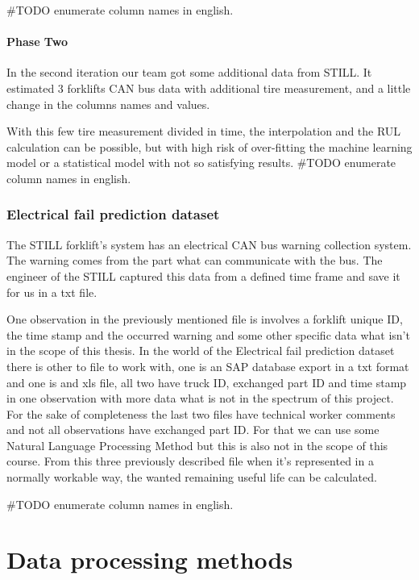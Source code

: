 \#TODO enumerate column names in english.
				\paragraph{Phase Two}
In the second iteration our team got some additional data from STILL. It estimated 3 forklifts CAN bus data with additional tire measurement, and a little change in the columns names and values.

With this few tire measurement divided in time, the interpolation and the RUL calculation can be possible, but with high risk of over-fitting the machine learning model or a statistical model with not so satisfying results.
\#TODO enumerate column names in english.
			\subsubsection{Electrical fail prediction dataset}
\noindent
The STILL forklift's system has an electrical CAN bus warning collection system. The warning comes from the part what can communicate with the bus. The engineer of the STILL captured this data from a defined time frame and save it for us in a txt file. 

\noindent
One observation in the previously mentioned file is involves a forklift unique ID, the time stamp and the occurred warning and some other specific data what isn't in the scope of this thesis.
\noindent
In the world of the Electrical fail prediction dataset there is other to file to work with, one is an SAP database export in a txt format and one is and xls file, all two have truck ID, exchanged part ID and time stamp in one observation with more data what is not in the spectrum of this project.
\noindent
For the sake of completeness the last two files have technical worker comments and not all observations have exchanged part ID. For that we can use some Natural Language Processing Method but this is also not in the scope of this course.
\noindent
From this three previously described file when it's represented in a normally workable way, the wanted remaining useful life can be calculated.

\#TODO enumerate column names in english.
	\section{Data processing methods}
